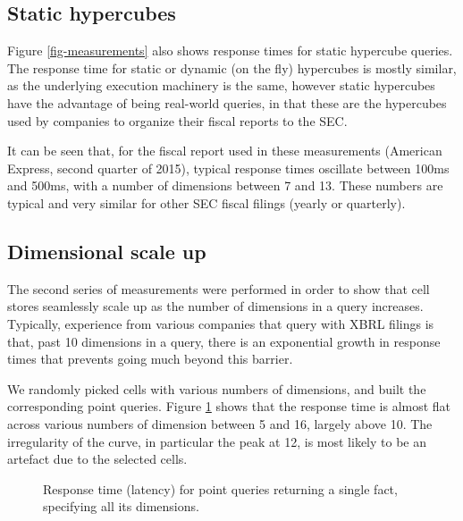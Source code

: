 \documentclass{acm_proc_article-sp}
\begin{document}
\subsection{Static hypercubes}

Figure \ref{fig-measurements} also shows response times for static hypercube queries. The response time for static or dynamic (on the fly) hypercubes is mostly similar, as the underlying execution machinery is the same, however static hypercubes have the advantage of being real-world queries, in that these are the hypercubes used by companies to organize their fiscal reports to the SEC.

It can be seen that, for the fiscal report used in these measurements (American Express, second quarter of 2015), typical response times oscillate between 100ms and 500ms, with a number of dimensions between 7 and 13. These numbers are typical and very similar for other SEC fiscal filings (yearly or quarterly).

\subsection{Dimensional scale up}

The second series of measurements were performed in order to show that cell stores seamlessly scale up as the number of dimensions in a query increases. Typically, experience from various companies that query with XBRL filings is that, past 10 dimensions in a query, there is an exponential growth in response times that prevents going much beyond this barrier.

We randomly picked cells with various numbers of dimensions, and built the corresponding point queries. Figure \ref{figure-dimension-scaleup} shows that the response time is almost flat across various numbers of dimension between 5 and 16, largely above 10. The irregularity of the curve, in particular the peak at 12, is most likely to be an artefact due to the selected cells.

\begin{figure}
\caption{Response time (latency) for point queries returning a single fact, specifying all its dimensions.}
\label{figure-dimension-scaleup}
\end{figure}
\end{document}
